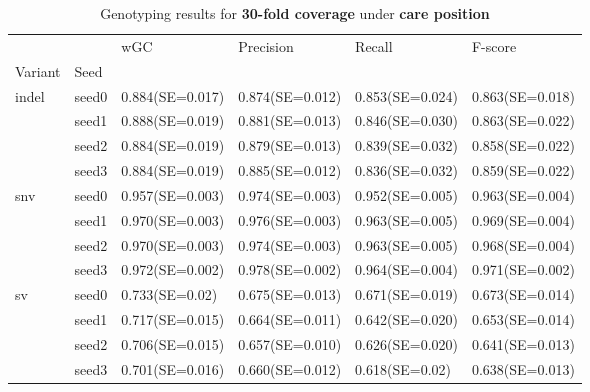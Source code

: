 \documentclass{PHlab-thesis}
\begin{document}
\begin{table}[ht!]
\begin{tabular*}{\textwidth}{@{\extracolsep{\fill}}llllll@{\extracolsep{\fill}}}
\toprule
   &         &               wGC &         Precision &            Recall &           F-score \\
Variant & Seed &                   &                   &                   &                   \\
\midrule
indel & seed0  & 0.884(SE=0.017)&0.874(SE=0.012)&  0.853(SE=0.024)&  0.863(SE=0.018) \\
   & seed1 &0.888(SE=0.019)&  0.881(SE=0.013)&  0.846(SE=0.030)&  0.863(SE=0.022)\\
   & seed2 & 0.884(SE=0.019)&  0.879(SE=0.013)&  0.839(SE=0.032)&  0.858(SE=0.022)\\
   & seed3 & 0.884(SE=0.019)&  0.885(SE=0.012)&  0.836(SE=0.032) & 0.859(SE=0.022)\\
   
\midrule
snv & seed0 & 0.957(SE=0.003)&  0.974(SE=0.003)&  0.952(SE=0.005)&  0.963(SE=0.004)\\
   & seed1 & 0.970(SE=0.003)&  0.976(SE=0.003)&  0.963(SE=0.005)&  0.969(SE=0.004)\\
   & seed2 & 0.970(SE=0.003)&  0.974(SE=0.003)&  0.963(SE=0.005)&  0.968(SE=0.004)\\
   & seed3 & 0.972(SE=0.002) &0.978(SE=0.002)&0.964(SE=0.004)& 0.971(SE=0.002)\\
  
\midrule
sv & seed0  & 0.733(SE=0.02)&  0.675(SE=0.013)&  0.671(SE=0.019)&  0.673(SE=0.014) \\
   & seed1 & 0.717(SE=0.015)&  0.664(SE=0.011)&  0.642(SE=0.020)&  0.653(SE=0.014)\\
   & seed2 & 0.706(SE=0.015)&  0.657(SE=0.010)&  0.626(SE=0.020)&  0.641(SE=0.013)\\
   & seed3 & 0.701(SE=0.016)&0.660(SE=0.012)&0.618(SE=0.02)&0.638(SE=0.013)\\
   
\bottomrule
\end{tabular*}
\caption{Genotyping results for \textbf{30-fold coverage } under \textbf{care position}\label{table:care-30x}}
\end{table}
\end{document}
